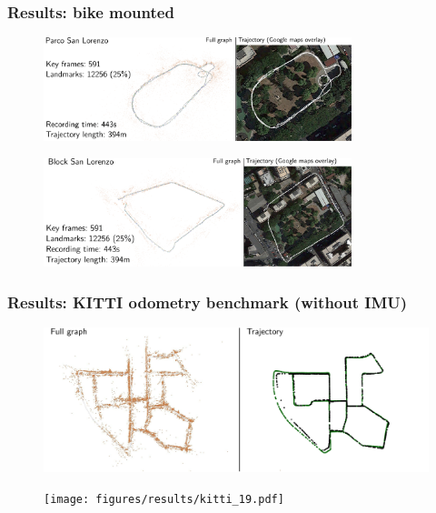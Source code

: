 \documentclass[11pt]{beamer}
\begin{document}
\begin{frame}
\frametitle{Results: bike mounted}
\begin{figure}[!htb]
\centering
\includegraphics[width=0.8\textwidth]{figures/results/san_lorenzo_parco.pdf}
\end{figure}
\begin{figure}[!htb]
\centering
\includegraphics[width=0.8\textwidth]{figures/results/san_lorenzo_street.pdf}
\end{figure}
\end{frame}

\begin{frame}
\frametitle{Results: KITTI odometry benchmark (without IMU)}
\begin{figure}[!htb]
\centering
\includegraphics[width=\textwidth]{figures/results/kitti_00.pdf}
\end{figure}
\begin{figure}[!htb]
\centering
\texttt{[image: figures/results/kitti\_19.pdf]}
\end{figure}
\end{frame}
\end{document}

